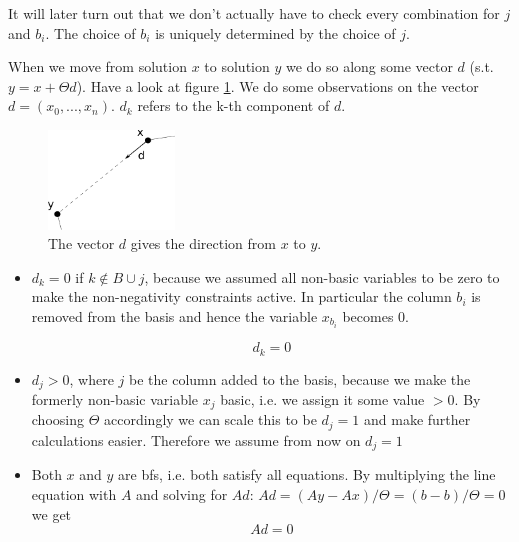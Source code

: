 It will later turn out that we don't actually have to check every combination for $j$ and $b_i$. The choice of $b_i$ is uniquely determined by the choice of $j$.

When we move from solution $x$ to solution $y$ we do so along some vector $d$ (s.t. $y=x+\Theta d$). Have a look at figure \ref{Fig:movingToSolutions}. We do some observations on the vector $d=(x_0,...,x_n)$. $d_k$ refers to the k-th component of $d$. 

\begin{figure}[hbt]
\begin{center}
\includegraphics[width=0.3\textwidth]{./images/movingToSolutions.pdf}
\end{center}
\caption{The vector $d$ gives the direction from $x$ to $y$.}
\label{Fig:movingToSolutions}
\end{figure}

\begin{itemize}
\item $d_k=0$ if $k\not \in B \cup j$, because we assumed all non-basic variables to be zero to make the non-negativity constraints active. In particular the column $b_i$ is removed from the basis and hence the variable $x_{b_i}$ becomes $0$.

\begin{equation} d_k=0 \label{equ:dkEquZero} \end{equation}

\item $d_j>0$, where $j$ be the column added to the basis, because we make the formerly non-basic variable $x_j$ basic, i.e. we assign it some value $>0$. By choosing $\Theta$ accordingly we can scale this to be $d_j=1$ and make further calculations easier. Therefore we assume from now on $d_j=1$

\item Both $x$ and $y$ are bfs, i.e. both satisfy all equations. By multiplying the line equation with $A$ and solving for $Ad$: $Ad = (Ay-Ax)/\Theta = (b-b)/\Theta = 0$ we get
\begin{equation} Ad = 0 \label{equ:AdEquZero}\end{equation}
\end{itemize}

